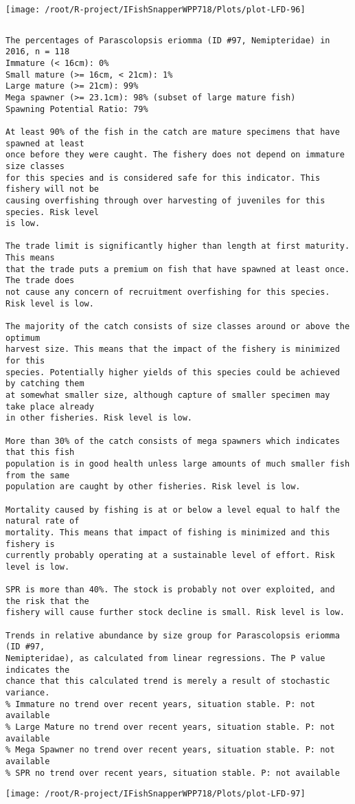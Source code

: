 \documentclass{report}\usepackage[]{graphicx}\usepackage[]{color}
\makeatletter
\def\maxwidth{ %
  \ifdim\Gin@nat@width>\linewidth
    \linewidth
  \else
    \Gin@nat@width
  \fi
}
\newenvironment{kframe}{%
 \def\at@end@of@kframe{}%
 \ifinner\ifhmode%
  \def\at@end@of@kframe{\end{minipage}}%
  \begin{minipage}{\columnwidth}%
 \fi\fi%
 \def\FrameCommand##1{\hskip\@totalleftmargin \hskip-\fboxsep
 \colorbox{shadecolor}{##1}\hskip-\fboxsep
     \hskip-\linewidth \hskip-\@totalleftmargin \hskip\columnwidth}%
 \MakeFramed {\advance\hsize-\width
   \@totalleftmargin\z@ \linewidth\hsize
   \@setminipage}}%
 {\par\unskip\endMakeFramed%
 \at@end@of@kframe}
\newenvironment{knitrout}{}{} %
\makeatother
\begin{document}
\begin{knitrout}
\texttt{[image: /root/R-project/IFishSnapperWPP718/Plots/plot-LFD-96]} 
\begin{kframe}\begin{verbatim}
\end{verbatim}
\end{kframe}
\clearpage
\newpage
\begin{kframe}\begin{verbatim}The percentages of Parascolopsis eriomma (ID #97, Nemipteridae) in 2016, n = 118
Immature (< 16cm): 0%
Small mature (>= 16cm, < 21cm): 1%
Large mature (>= 21cm): 99%
Mega spawner (>= 23.1cm): 98% (subset of large mature fish)
Spawning Potential Ratio: 79%
 
At least 90% of the fish in the catch are mature specimens that have spawned at least
once before they were caught. The fishery does not depend on immature size classes
for this species and is considered safe for this indicator. This fishery will not be
causing overfishing through over harvesting of juveniles for this species. Risk level
is low.

The trade limit is significantly higher than length at first maturity.  This means
that the trade puts a premium on fish that have spawned at least once. The trade does
not cause any concern of recruitment overfishing for this species. Risk level is low.

The majority of the catch consists of size classes around or above the optimum
harvest size. This means that the impact of the fishery is minimized for this
species. Potentially higher yields of this species could be achieved by catching them
at somewhat smaller size, although capture of smaller specimen may take place already
in other fisheries. Risk level is low.

More than 30% of the catch consists of mega spawners which indicates that this fish
population is in good health unless large amounts of much smaller fish from the same
population are caught by other fisheries. Risk level is low.
 
Mortality caused by fishing is at or below a level equal to half the natural rate of
mortality. This means that impact of fishing is minimized and this fishery is
currently probably operating at a sustainable level of effort. Risk level is low.
 
SPR is more than 40%. The stock is probably not over exploited, and the risk that the
fishery will cause further stock decline is small. Risk level is low.
 
Trends in relative abundance by size group for Parascolopsis eriomma (ID #97,
Nemipteridae), as calculated from linear regressions. The P value indicates the
chance that this calculated trend is merely a result of stochastic variance.
% Immature no trend over recent years, situation stable. P: not available
% Large Mature no trend over recent years, situation stable. P: not available
% Mega Spawner no trend over recent years, situation stable. P: not available
% SPR no trend over recent years, situation stable. P: not available
\end{verbatim}
\end{kframe}
\texttt{[image: /root/R-project/IFishSnapperWPP718/Plots/plot-LFD-97]} 


\end{knitrout}
\end{document}
